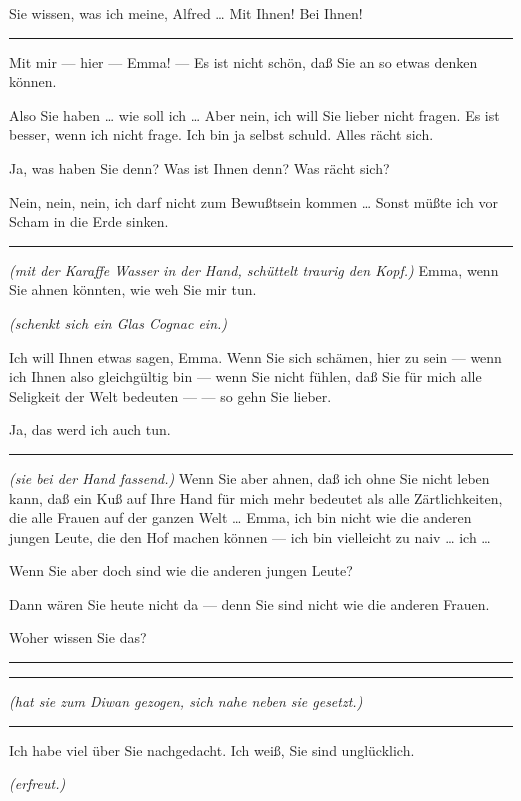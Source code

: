 \documentclass[
	final,
	a4paper,
	ngerman,
	mpinclude = true, %
	twoside = true,
	open = right,
	cleardoublepage = plain,
	DIV = 13,
	BCOR = 1cm,
	titlepage = firstiscover,
	]{scrbook}
\newcommand{\direction}[1]{\textit{(#1)}}
\newenvironment{deletion}{%
		\vspace{0.25\baselineskip}
		\hrule
		\vspace{0.25\baselineskip}
		\color{darkgray}
	}{
		\color{black}
		\vspace{0.25\baselineskip}
		\hrule 
		\vspace{0.25\baselineskip}
	}
\newcommand{\thecharacter}[1]{\textup{\textsc{#1}}\xspace}
\newcommand{\theherr}{\thecharacter{Benjamin}}
\newcommand{\thefrau}{\thecharacter{Emma}}
\newcommand{\character}[1]{\item[#1:]}
\newcommand{\herr}{\character{\theherr}}
\newcommand{\frau}{\character{\thefrau}}
\begin{document}
\begin{play}
	\frau
	Sie wissen, was ich meine, Alfred \ldots{} Mit Ihnen! Bei Ihnen!

	\begin{deletion}
	\herr
	Mit mir --- hier --- Emma! --- Es ist nicht schön, daß Sie an so etwas denken können.

	\frau
	Also Sie haben \ldots{} wie soll ich \ldots{} Aber nein, ich will Sie lieber nicht fragen. Es ist besser, wenn ich nicht frage. Ich bin ja selbst schuld. Alles rächt sich.

	\herr
	Ja, was haben Sie denn? Was ist Ihnen denn? Was rächt sich?

	\frau
	Nein, nein, nein, ich darf nicht zum Bewußtsein kommen \ldots{} Sonst müßte ich vor Scham in die Erde sinken.
	\end{deletion}

	\herr
	\direction{mit der Karaffe Wasser in der Hand, schüttelt traurig den Kopf.} Emma, wenn Sie ahnen könnten, wie weh Sie mir tun.

	\frau
	\direction{schenkt sich ein Glas Cognac ein.}

	\herr
	Ich will Ihnen etwas sagen, Emma. Wenn Sie sich schämen, hier zu sein --- wenn ich Ihnen also gleichgültig bin --- wenn Sie nicht fühlen, daß Sie für mich alle Seligkeit der Welt bedeuten --- --- so gehn Sie lieber.

	\frau
	Ja, das werd ich auch tun.

	\begin{deletion}
	\herr
	\direction{sie bei der Hand fassend.} Wenn Sie aber ahnen, daß ich ohne Sie nicht leben kann, daß ein Kuß auf Ihre Hand für mich mehr bedeutet als alle Zärtlichkeiten, die alle Frauen auf der ganzen Welt \ldots{} Emma, ich bin nicht wie die anderen jungen Leute, die den Hof machen können --- ich bin vielleicht zu naiv \ldots{} ich \ldots{}

	\frau
	Wenn Sie aber doch sind wie die anderen jungen Leute?

	\herr
	Dann wären Sie heute nicht da --- denn Sie sind nicht wie die anderen Frauen.

	\frau
	Woher wissen Sie das?
	\end{deletion}

	\herr
	\begin{deletion}
		\direction{hat sie zum Diwan gezogen, sich nahe neben sie gesetzt.}
	\end{deletion}
	Ich habe viel über Sie nachgedacht. Ich weiß, Sie sind unglücklich.

	\frau
	\direction{erfreut.}


\end{play}
\end{document}
